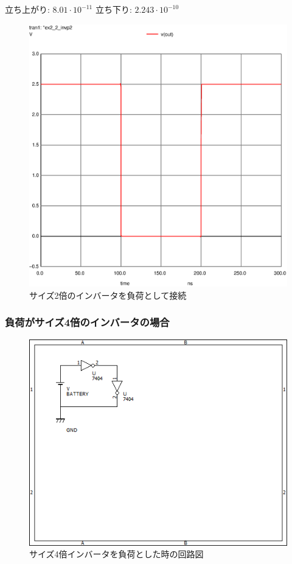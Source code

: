 \documentclass{jsarticle}
\begin{document}
\begin{flushleft}
    立ち上がり: $8.01 \cdot 10^{-11}$
    立ち下り: $2.243 \cdot 10^{-10}$
\end{flushleft}
\begin{figure}[H]
    \hspace{50pt}
    \includegraphics[scale=0.8]{ex2_2_invp2.ps}
    \vspace{30pt}
    \caption{サイズ2倍のインバータを負荷として接続}
\end{figure}

\subsubsection{負荷がサイズ4倍のインバータの場合}
\begin{figure}[H]
    \centering
    \includegraphics[bb=0 0 500 400]{ex2_2_inv.png}
    \caption{サイズ4倍インバータを負荷とした時の回路図}
\end{figure}
\end{document}
